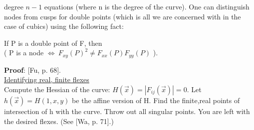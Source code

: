 degree $n-1$ equations (where n is the degree of the curve).
One can distinguish nodes from cusps for double points (which
is all we are concerned with in the case of cubics) using the 
following fact:
\begin{lemma} \nopagebreak
If P is a double point of F, then \\
( P is a node $\Leftrightarrow\ F_{xy}(P)^{2} \neq F_{xx}(P)F_{yy}(P)$ ).
\end{lemma}
{\bf Proof}:
[Fu, p. 68].\vspace{.25in} \\
\underline{Identifying real, finite flexes}\vspace{.25in} \\
Compute the Hessian of the curve: $H(\vec{x}) = |F_{ij}(\vec{x})| = 0.$
Let $h(\vec{x}) = H(1,x,y)$ be the affine version of H.
Find the finite,real points of intersection of h with the curve.
Throw out all singular points.
You are left with the desired flexes.
(See [Wa, p. 71].)


